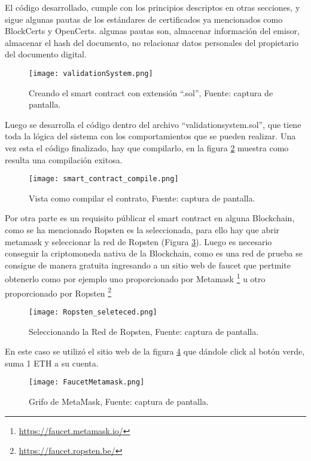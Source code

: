 El código desarrollado, cumple con los principios descriptos en otras secciones, 
y sigue algunas pautas de los estándares de certificados ya mencionados como BlockCerts y OpenCerts.
algunas pautas son, almacenar información del emisor, almacenar el hash del documento, no relacionar datos
personales del propietario del documento digital.

 

\begin{figure}[hbt!]
  \centering
  {\texttt{[image: validationSystem.png]}}
  \caption{Creando el smart contract con extensión “.sol”, Fuente: captura de pantalla. }
  \label{img:valdationSystem}
\end{figure}

Luego se desarrolla el código dentro del archivo “validationsystem.sol”, que tiene toda la lógica
del sistema con los comportamientos que se pueden realizar.
Una vez esta el código finalizado, hay que compilarlo, en la figura   \ref{img:smart_contract_compile}
muestra como resulta una compilación exitosa.
\begin{figure}[hbt!]
  \centering
  {\texttt{[image: smart\_contract\_compile.png]}}
  \caption{Vista como compilar el contrato, Fuente: captura de pantalla. }
  \label{img:smart_contract_compile}
\end{figure}


Por otra parte es un requisito públicar el smart contract en alguna Blockchain, como se ha mencionado Ropsten
es la seleccionada, para ello hay que abrir metamask y seleccionar la red de Ropsten (Figura \ref{img:ropsten_selected}).
Luego es necesario conseguir la criptomoneda nativa de la Blockchain, como es una red de prueba se consigue de manera gratuita
ingresando a un sitio web de \gls{faucet} que pertmite obtenerlo como por ejemplo uno proporcionado por Metamask \footnote{\url{https://faucet.metamask.io/}} u otro 
proporcionado por Ropsten \footnote{\url{https://faucet.ropsten.be/}}  
\begin{figure}[H]
  \centering
  {\texttt{[image: Ropsten\_seleteced.png]}}
  \caption{Seleccionando la Red de Ropsten, Fuente: captura de pantalla. }
  \label{img:ropsten_selected}
\end{figure}

En este caso se utilizó el sitio web de la figura \ref{img:faucet_metamask} que dándole click al botón verde,
suma 1 ETH a su cuenta.
\begin{figure}[H]
  \centering
  {\texttt{[image: FaucetMetamask.png]}}
  \caption{Grifo de MetaMask, Fuente: captura de pantalla. }
  \label{img:faucet_metamask}
\end{figure}

